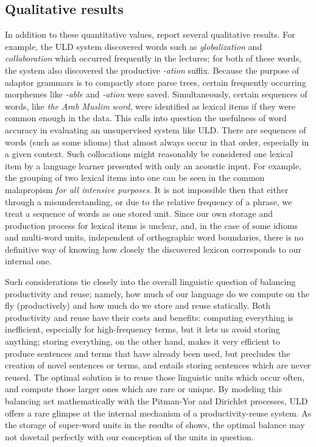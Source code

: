 \documentclass[12pt,letterpaper]{article}
\begin{document}
\subsection{Qualitative results}
In addition to these quantitative values, \citet{lee:2015} report several qualitative results. For example, the ULD system discovered words such as \textit{globalization} and \textit{collaboration} which occurred frequently in the lectures; for both of these words, the system also discovered the productive \textit{-ation} suffix. Because the purpose of adaptor grammars is to compactly store parse trees, certain frequently occurring morphemes like \textit{-able} and \textit{-ation} were saved. Simultaneously, certain sequences of words, like \textit{the Arab Muslim word}, were identified as lexical items if they were common enough in the data. This calls into question the usefulness of word accuracy in evaluating an unsupervised system like ULD. There are sequences of words (such as some idioms) that almost always occur in that order, especially in a given context. Such collocations might reasonably be considered one lexical item by a language learner presented with only an acoustic input. For example, the grouping of two lexical items into one can be seen in the common malapropism \textit{for all intensive purposes}. It is not impossible then that either through a misunderstanding, or due to the relative frequency of a phrase, we treat a sequence of words as one stored unit. Since our own storage and production process for lexical items is unclear, and, in the case of some idioms and multi-word units, independent of orthographic word boundaries, there is no definitive way of knowing how closely the discovered lexicon corresponds to our internal one. 

Such considerations tie closely into the overall linguistic question of balancing productivity and reuse; namely, how much of our language do we compute on the fly (productively) and how much do we store and reuse statically. Both productivity and reuse have their costs and benefits: computing everything is inefficient, especially for high-frequency terms, but it lets us avoid storing anything; storing everything, on the other hand, makes it very efficient to produce sentences and terms that have already been used, but precludes the creation of novel sentences or terms, and entails storing sentences which are never reused. The optimal solution is to reuse those linguistic units which occur often, and compute those larger ones which are rare or unique. By modeling this balancing act mathematically with the Pitman-Yor and Dirichlet processes, ULD offers a rare glimpse at the internal mechanism of a productivity-reuse system. As the storage of super-word units in the results of \citet{lee:2015} shows, the optimal balance may not dovetail perfectly with our conception of the units in question. 
\end{document}
